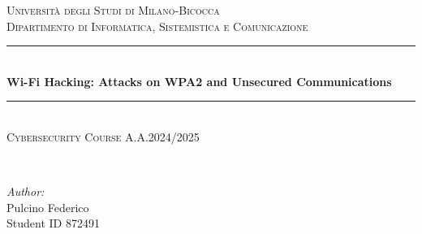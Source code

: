 \begin{titlepage}
	\centering
    \textsc{Università degli Studi di Milano-Bicocca \\ Dipartimento di Informatica, Sistemistica e Comunicazione}\\[2.0 cm]	%
    \vspace*{3 cm}
    \rule{\linewidth}{0.2 mm} \\[1.5 cm]
	{ \huge \bfseries Wi-Fi Hacking: Attacks on WPA2 and Unsecured Communications}\\
    \vspace*{2.0 cm}
    \rule{\linewidth}{0.2 mm} \\[1.5 cm]
    \textsc{Cybersecurity Course A.A.2024/2025}\\[1.5 cm]				%
    
    \vspace*{4 cm}
	
	\begin{minipage}{0.4\textwidth}
		\begin{flushleft} \large
			\end{flushleft}
			\end{minipage}~
			\begin{minipage}{0.4\textwidth}
            
		\begin{flushright} \large
			\emph{Author:} \\
			Pulcino Federico\\
            Student ID 872491\\
		\end{flushright}
        
	\end{minipage}\\[2 cm]
 
\end{titlepage}